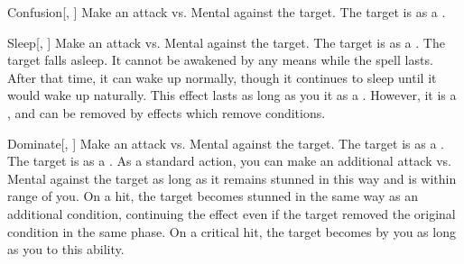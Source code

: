 \lowercase{\hypertarget{spell:Confusion}{}}\label{spell:Confusion}
\begin{freeability}[Rank 4]{\hypertarget{spell:Confusion}{Confusion}}[, ]
Make an attack vs. Mental against the target.
\hit The target is \confused as a .
\end{freeability}
\vspace{0.25em}



\lowercase{\hypertarget{spell:Sleep}{}}\label{spell:Sleep}
\begin{freeability}[Rank 4]{\hypertarget{spell:Sleep}{Sleep}}[, ]
Make an attack vs. Mental against the target.
\hit The target is \blinded as a .
\crit The target falls asleep.
It cannot be awakened by any means while the spell lasts.
After that time, it can wake up normally, though it continues to sleep until it would wake up naturally.
This effect lasts as long as you  it as a .
However, it is a , and can be removed by effects which remove conditions.
\end{freeability}
\vspace{0.25em}



\lowercase{\hypertarget{spell:Dominate}{}}\label{spell:Dominate}
\begin{freeability}[Rank 5]{\hypertarget{spell:Dominate}{Dominate}}[, ]
Make an attack vs. Mental against the target.
\hit The target is  as a .
\crit The target is  as a .
As a standard action, you can make an additional attack vs. Mental against the target as long as it remains stunned in this way and is within \rngmed range of you.
On a hit, the target becomes stunned in the same way as an additional condition, continuing the effect even if the target removed the original condition in the same phase.
On a critical hit, the target becomes  by you as long as you  to this ability.
\end{freeability}
\vspace{0.25em}



